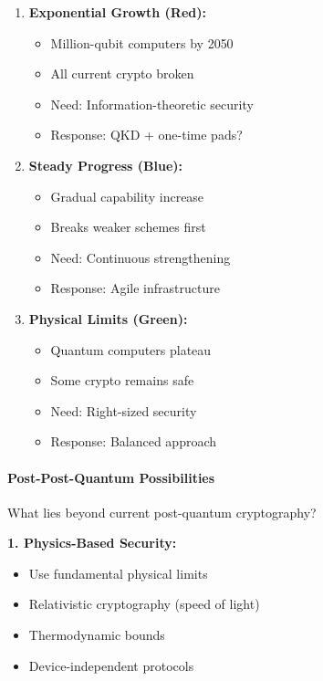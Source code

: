 \documentclass[11pt,a4paper]{article}
\begin{document}
\begin{enumerate}
    \item \textbf{Exponential Growth (Red):}
    \begin{itemize}
        \item Million-qubit computers by 2050
        \item All current crypto broken
        \item Need: Information-theoretic security
        \item Response: QKD + one-time pads?
    \end{itemize}
    
    \item \textbf{Steady Progress (Blue):}
    \begin{itemize}
        \item Gradual capability increase
        \item Breaks weaker schemes first
        \item Need: Continuous strengthening
        \item Response: Agile infrastructure
    \end{itemize}
    
    \item \textbf{Physical Limits (Green):}
    \begin{itemize}
        \item Quantum computers plateau
        \item Some crypto remains safe
        \item Need: Right-sized security
        \item Response: Balanced approach
    \end{itemize}
\end{enumerate}

\paragraph{Post-Post-Quantum Possibilities}

What lies beyond current post-quantum cryptography?

\textbf{1. Physics-Based Security:}
\begin{itemize}
    \item Use fundamental physical limits
    \item Relativistic cryptography (speed of light)
    \item Thermodynamic bounds
    \item Device-independent protocols
\end{itemize}
\end{document}
